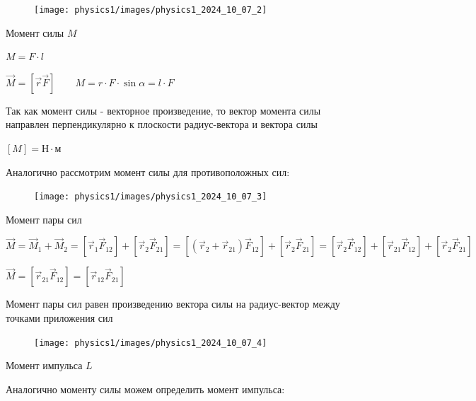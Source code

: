 \documentclass[12pt]{article}
\begin{document}
    \begin{enumerate}

        \begin{minipage}{\textwidth}
            \begin{figure}
                \texttt{[image: physics1/images/physics1\_2024\_10\_07\_2]}
            \end{figure}

            \item Момент силы $M$

            $M = F \cdot l$

            $\vec{M} = [\vec{r} \vec{F}] \qquad M = r \cdot F \cdot \sin\alpha = l \cdot F$

            Так как момент силы - векторное произведение, то вектор момента силы направлен перпендикулярно к плоскости
            радиус-вектора и вектора силы

            $[M] = \text{Н} \cdot \text{м}$


            Аналогично рассмотрим момент силы для противоположных сил:

            \begin{figure}
                \texttt{[image: physics1/images/physics1\_2024\_10\_07\_3]}
            \end{figure}

            \item Момент пары сил

            $\vec{M} = \vec{M}_1 + \vec{M}_2 = [\vec{r}_1 \vec{F}_{12}] + [\vec{r}_2 \vec{F}_{21}] =
            [(\vec{r}_2 + \vec{r}_{21}) \vec{F}_{12}] + [\vec{r}_2 \vec{F}_{21}] = [\vec{r}_2 \vec{F}_{12}] + [\vec{r}_{21} \vec{F}_{12}] + [\vec{r}_2 \vec{F}_{21}]$

            $\vec{M} = [\vec{r}_{21} \vec{F}_{12}] = [\vec{r}_{12} \vec{F}_{21}]$

            Момент пары сил равен произведению вектора силы на радиус-вектор между точками приложения сил

            \begin{figure}
                \texttt{[image: physics1/images/physics1\_2024\_10\_07\_4]}
            \end{figure}

            \item Момент импульса $L$

            Аналогично моменту силы можем определить момент импульса:


\end{minipage}
\end{enumerate}
\end{document}
